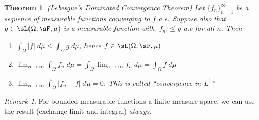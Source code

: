 \documentclass[12pt]{article}
\theoremstyle{plain}
\newtheorem{thm}{Theorem}[section]
\theoremstyle{definition}
\theoremstyle{remark}
\newtheorem*{rmk}{Remark}
\newcommand{\ninf}{_{n=1}^\infty}
\newcommand{\limn}{\lim_{n\rightarrow\infty}}
\begin{document}
\begin{thm}\emph{(Lebesgue's Dominated Convergence Theorem)}
Let $\{f_n\}\ninf$ be a sequence of measurable functions converging to $f$
a.e. Suppose also that $g\in\sL(\Omega,\sF,\mu)$ is a measurable
function with $|f_n|\leq g$ a.e for all $n$. Then
\begin{enumerate}[label=\emph{(\roman*)}]
  \item $\int_\Omega |f| \;d\mu \leq \int_\Omega g \;d\mu$, hence
    $f\in\sL(\Omega,\sF,\mu)$
  \item
    $\limn \int_\Omega f_n \; d\mu = \int_\Omega \limn f_n \; d\mu
    =\int_\Omega f\;d\mu$
  \item $\limn \int_\Omega |f_n-f|\;d\mu = 0$.
    This is called ``convergence in $L^1$''
\end{enumerate}
\end{thm}
\begin{rmk}
For bounded measurable functions a finite measure space, we can use the
result (exchange limit and integral) \emph{always}.
\end{rmk}
\end{document}
